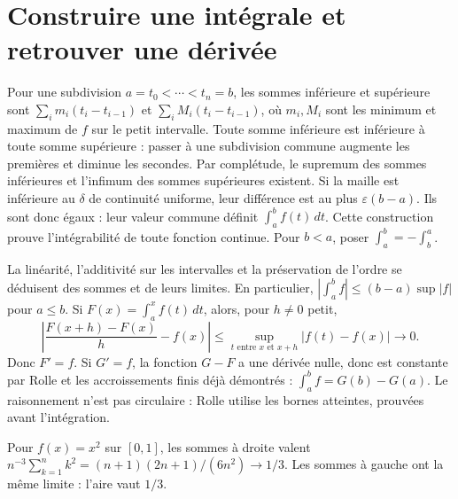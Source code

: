 \documentclass[../cours_1re.tex]{subfiles}
\begin{document}
\section{Construire une intégrale et retrouver une dérivée}
Pour une subdivision $a=t_0<\cdots<t_n=b$, les sommes inférieure et supérieure
sont $\sum_i m_i(t_i-t_{i-1})$ et $\sum_i M_i(t_i-t_{i-1})$,
où $m_i,M_i$ sont les minimum et maximum de $f$ sur le petit intervalle.
Toute somme inférieure est inférieure à toute somme supérieure :
passer à une subdivision commune augmente les premières et diminue les secondes.
Par complétude, le supremum des sommes inférieures et l'infimum des
sommes supérieures existent. Si la maille est inférieure au $\delta$
de continuité uniforme, leur différence est au plus $\varepsilon(b-a)$.
Ils sont donc égaux : leur valeur commune définit $\int_a^b f(t)\,dt$.
Cette construction prouve l'intégrabilité de toute fonction continue.
Pour $b<a$, poser $\int_a^b=-\int_b^a$.

La linéarité, l'additivité sur les intervalles et la préservation de l'ordre
se déduisent des sommes et de leurs limites. En particulier,
$|\int_a^b f|\le(b-a)\sup|f|$ pour $a\le b$.
Si $F(x)=\int_a^x f(t)\,dt$, alors, pour $h\ne0$ petit,
\[
\left|\frac{F(x+h)-F(x)}h-f(x)\right|
\le\sup_{t\text{ entre }x\text{ et }x+h}|f(t)-f(x)|\longrightarrow0.
\]
Donc $F'=f$. Si $G'=f$, la fonction $G-F$ a une dérivée nulle,
donc est constante par Rolle et les accroissements finis déjà démontrés :
$\int_a^b f=G(b)-G(a)$.
Le raisonnement n'est pas circulaire : Rolle utilise les bornes atteintes,
prouvées avant l'intégration.

Pour $f(x)=x^2$ sur $[0,1]$, les sommes à droite valent
$n^{-3}\sum_{k=1}^nk^2=(n+1)(2n+1)/(6n^2)\to1/3$.
Les sommes à gauche ont la même limite : l'aire vaut $1/3$.
\end{document}
